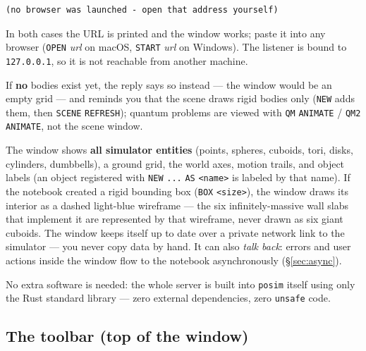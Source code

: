 \documentclass[11pt]{article}
\newcommand{\kw}[1]{\texttt{\uppercase{#1}}}
\newcommand{\code}[1]{\texttt{#1}}
\begin{document}
\begin{lstlisting}
(no browser was launched - open that address yourself)
\end{lstlisting}

In both cases the URL is printed and the window works; paste it into any
browser (\kw{open} \textit{url} on macOS, \kw{start} \textit{url} on
Windows). The listener is bound to \texttt{127.0.0.1}, so it is not
reachable from another machine.

If \textbf{no} bodies exist yet, the reply says so instead --- the
window would be an empty grid --- and reminds you that the scene draws
rigid bodies only (\kw{new} adds them, then \kw{scene} \kw{refresh});
quantum problems are viewed with \kw{qm} \kw{animate} /
\kw{qm2} \kw{animate}, not the scene window.

The window shows \textbf{all simulator entities} (points, spheres,
cuboids, tori, disks, cylinders, dumbbells), a ground grid, the world
axes, motion trails, and object labels (an object registered with
\kw{new} \code{...} \kw{as} \code{<name>} is labeled by that name).
If the notebook created a rigid
bounding box (\kw{box} \code{<size>}), the window draws its interior
as a dashed light-blue wireframe --- the six infinitely-massive wall
slabs that implement it are represented by that wireframe, never
drawn as six giant cuboids. The window keeps itself up to date over a
private network link to the simulator --- you never copy data by
hand. It can also \emph{talk back}: errors and user actions inside
the window flow to the notebook asynchronously (\S\ref{sec:async}).

No extra software is needed: the whole server is built into
\code{posim} itself using only the Rust standard library --- zero
external dependencies, zero \code{unsafe} code.

\subsection{The toolbar (top of the window)}
\end{document}
